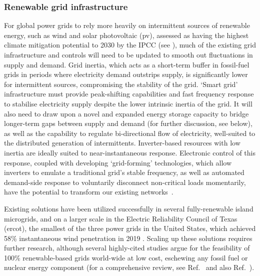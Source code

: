 \documentclass[../SustainableHEP.tex]{subfiles}
\begin{document}
\subsubsection{Renewable grid infrastructure}
\label{subsec:grid}
For global power grids to rely more heavily on intermittent sources of renewable energy, such as wind and solar photovoltaic (\acrshort{pv}), assessed as having the highest climate mitigation potential to 2030 by the IPCC (see ), much of the existing grid infrastructure and controls will need to be updated to smooth out fluctuations in supply and demand.  Grid inertia, which acts as a short-term buffer in fossil-fuel grids in periods where electricity demand outstrips supply, is significantly lower for intermittent sources, compromising the stability of the grid. `Smart grid' infrastructure must provide peak-shifting capabilities and fast frequency response to stabilise electricity supply despite the lower intrinsic inertia of the grid.  It will also need to draw upon a novel and expanded energy storage capacity to bridge longer-term gaps between supply and demand (for further discussion, see below), as well as the capability to regulate bi-directional flow of electricity, well-suited to the distributed generation of intermittents.  Inverter-based resources with low inertia are ideally suited to near-instantaneous response.  Electronic control of this response, coupled with developing `grid-forming' technologies, which allow inverters to emulate a traditional grid's stable frequency, as well as automated demand-side response to voluntarily disconnect non-critical loads momentarily, have the potential to transform our existing networks~\cite{PowerGridInertia}.  

Existing solutions have been utilized successfully in several fully-renewable island microgrids, and on a larger scale in the Electric Reliability Council of Texas (\acrshort{ercot}), the smallest of the three power grids in the United States, which achieved 58\% instantaneous wind penetration in 2019 \cite{PowerGridInertia}.  Scaling up these solutions requires further research, although several highly-cited studies argue for the feasibility of 100\% renewable-based grids world-wide at low cost, eschewing any fossil fuel or nuclear energy component (for a comprehensive review, see Ref.~\cite{HEARD20171122} and also Ref.~\cite{BROWN2018834}).  
\end{document}
